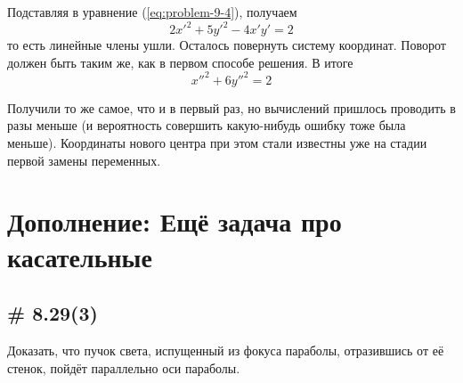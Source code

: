 \documentclass[a4paper,12pt]{article}
\begin{document}
\begin{solution}
    Подставляя в уравнение (\ref{eq:problem-9-4}), получаем
    \[
      2x'^2 + 5y'^2 - 4x'y' = 2
    \]
    то есть линейные члены ушли.
    Осталось повернуть систему координат.
    Поворот должен быть таким же, как в первом способе решения.
    В итоге
    \[
      x''^2 + 6y''^2 = 2
    \]
    
    Получили то же самое, что и в первый раз, но вычислений пришлось проводить в разы меньше (и вероятность совершить какую-нибудь ошибку тоже была меньше).
    Координаты нового центра при этом стали известны уже на стадии первой замены переменных.
  \end{solution}
  
  
  \section{Дополнение: Ещё задача про касательные}
  
  \subsection{\# 8.29(3)}
  
  Доказать, что пучок света, испущенный из фокуса параболы, отразившись от её стенок, пойдёт параллельно оси параболы.
  
\end{document}
